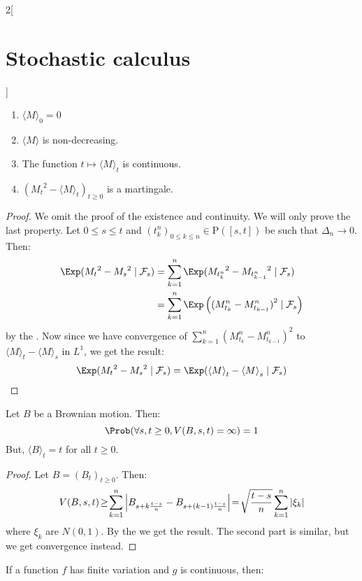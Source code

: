 \documentclass[../../../main_math.tex]{subfiles}
\begin{document}
\begin{multicols}{2}[\section{Stochastic calculus}]
\begin{theorem}
    \begin{enumerate}
      \item\label{SC:quad_var1} ${\langle M\rangle}_0=0$
      \item\label{SC:quad_var2} $\langle M\rangle$ is non-decreasing.
      \item\label{SC:quad_var3} The function $t\mapsto {\langle M\rangle}_t$ is continuous.
      \item\label{SC:quad_var4} ${({M_t}^2-{\langle M\rangle}_t)}_{t\geq 0}$ is a martingale.
    \end{enumerate}
  \end{theorem}
  \begin{proof}
    We omit the proof of the existence and continuity. We will only prove the last property. Let $0\leq s\leq t$ and ${(t_k^n)}_{0\leq k\leq n}\in \mathrm{P}([s,t])$ be such that $\Delta_n\to 0$. Then:
    \begin{align*}
      \Exp({M_t}^2-{M_s}^2\mid \mathcal{F}_s) & =\sum_{k=1}^n \Exp({M_{t_k^n}}^2-{M_{t_{k-1}^n}}^2\mid \mathcal{F}_s)          \\
                                              & =\sum_{k=1}^n \Exp\left({(M_{t_k}^n-M_{t_{k-1}}^n)}^2\mid \mathcal{F}_s\right) \\
    \end{align*}
    by the . Now since we have convergence of $\sum_{k=1}^{n}{(M_{t_k}^n-M_{t_{k-1}}^n)}^2$ to ${\langle M\rangle}_t-{\langle M\rangle}_s$ in $L^1$, we get the result:
    $$
      \Exp({M_t}^2-{M_s}^2\mid \mathcal{F}_s)=\Exp({\langle M\rangle}_t-{\langle M\rangle}_s\mid \mathcal{F}_s)
    $$
  \end{proof}
  \begin{proposition}
    Let $B$ be a Brownian motion. Then:
    $$
      \Prob(\forall s,t\geq 0, V(B,s,t)=\infty)=1
    $$
    But, ${\langle B\rangle}_t=t$ for all $t\geq 0$.
  \end{proposition}
  \begin{proof}
    Let $B={(B_t)}_{t\geq 0}$. Then:
    $$
      V(B,s,t)\!\geq\! \sum_{k=1}^{n}\abs{B_{s+k\frac{t-s}{n}}-B_{s+(k-1)\frac{t-s}{n}}}\!=\!\sqrt{\frac{t-s}{n}}\sum_{k=1}^{n}\abs{\xi_k}
    $$
    where $\xi_k$ are \iid $N(0,1)$. By the  we get the result. The second part is similar, but we get convergence instead.
  \end{proof}
  \begin{proposition}\label{SC:prop_variation_fg}
    If a function $f$ has finite variation and $g$ is continuous, then:

\end{proposition}
\end{multicols}
\end{document}
